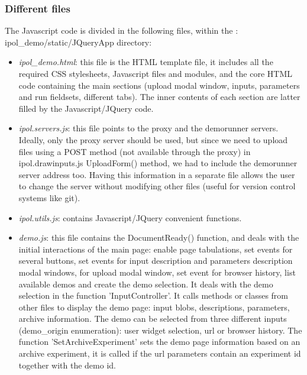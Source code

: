 \subsubsection{Different files}

The Javascript code is divided in the following files, within the :
ipol\_demo/\-static/\-JQuery\-App directory:
\begin{itemize}

 \item \emph{ipol\_demo.html}: this file is the HTML template file, it includes all the
  required CSS stylesheets, Javascript files and modules, and the core HTML
  code containing the main sections (upload modal window, inputs, parameters and 
  run fieldsets, different tabs). The inner contents of each section are latter
  filled by the Javascript/JQuery code.

 \item \emph{ipol.servers.js}: this file points to the proxy and the demorunner
  servers. Ideally, only the proxy server should be used, but since we need to upload
  files using a POST method (not available through the proxy) in ipol.drawinputs.js 
  UploadForm() method, we had to include the demorunner server address too.
  Having this information in a separate file allows the user to change the server
  without modifying other files (useful for version control systems like git).

 \item \emph{ipol.utils.js}: contains Javascript/JQuery convenient functions.

 \item \emph{demo.js}: this file contains the DocumentReady() function,
  and deals with the initial interactions of the main page: enable page tabu\-lations,
  set events for several buttons, set events for input description and parameters
  description modal windows, for upload modal window, set event for browser history,
  list available demos and create the demo selection. It deals with
  the demo selection in the function 'Input\-Controller'. It calls methods or classes
  from other files to display the demo page: input blobs, descriptions, parameters,
  archive information. 
  The demo can be selected
  from three different inputs (demo\_origin enumeration): user widget selection,
  url or browser history. The function 'Set\-Archive\-Experiment' sets the demo
  page information based on an archive experiment, it is called if the url parameters
  contain an experiment id together with the demo id.



\end{itemize}
